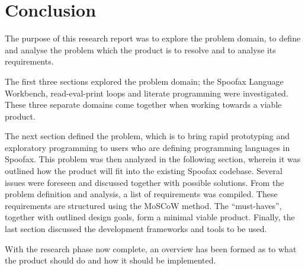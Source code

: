 \section{Conclusion}
\label{sec:a-conclusion}

The purpose of this research report was to explore the problem domain, to define
and analyse the problem which the product is to resolve and to analyse its
requirements.

The first three sections explored the problem domain; the Spoofax Language
Workbench, read-eval-print loops and literate programming were investigated.
These three separate domains come together when working towards a viable product.

The next section defined the problem, which is to bring rapid prototyping and
exploratory programming to users who are defining programming languages in
Spoofax. This problem was then analyzed in the following section, wherein it
was outlined how the product will fit into the existing Spoofax codebase.
Several issues were foreseen and discussed together with possible solutions.
From the problem definition and analysis, a list of requirements was compiled.
These requirements are structured using the MoSCoW method. The ``must-haves'',
together with outlined design goals, form a minimal viable product. Finally,
the last section discussed the development frameworks and tools to be used.

With the research phase now complete, an overview has been formed as to what the
product should do and how it should be implemented.

